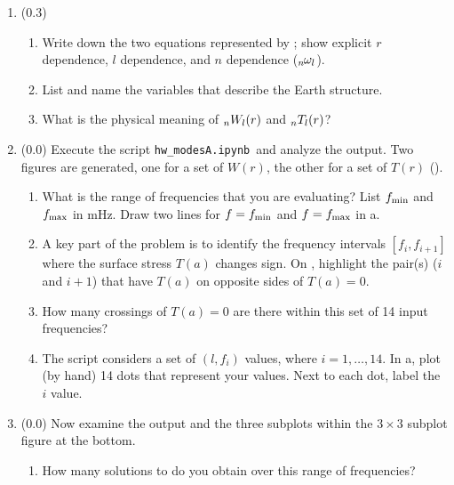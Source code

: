 \documentclass[11pt,titlepage,fleqn]{article}
\newcommand{\tfilemain}{{\tt hw\_modesA.ipynb}}
\begin{document}
\begin{enumerate}
\item (0.3)
%
\begin{enumerate}
\item Write down the two equations represented by ; show explicit $r$ dependence, $l$ dependence, and $n$ dependence (\eg $\mbox{${}_{n\hspace{-0.2 mm}}\omega_l$}$).
\item List and name the variables that describe the Earth structure.

\item What is the physical meaning of $\mbox{${}_nW_l$}(r)$ and $\mbox{${}_nT_l$}(r)$?
\end{enumerate}


\item (0.0) Execute the script \tfilemain\ and analyze the output. Two figures are generated, one for a set of $W(r)$, the other for a set of $T(r)$ ().
%
\begin{enumerate}
\item What is the range of frequencies that you are evaluating? List $f_{\rm min}$ and $f_{\rm max}$ in mHz. Draw two lines for $f = f_{\rm min}$ and $f = f_{\rm max}$ in a.

\item A key part of the problem is to identify the frequency intervals $[f_i, f_{i+1}]$ where the surface stress $T(a)$ changes sign. On , highlight the pair(s) ($i$ and $i+1$) that have $T(a)$ on opposite sides of $T(a) = 0$.

\item How many crossings of $T(a) = 0$ are there within this set of 14 input frequencies?

\item The script considers a set of $(l, f_i)$ values, where $i = 1, \ldots, 14$. In a, plot (by hand) 14 dots that represent your values. Next to each dot, label the $i$ value.

\end{enumerate}

\label{prob:Tr}


\item (0.0) Now examine the output and the three subplots within the $3 \times 3$ subplot figure at the bottom.
%
\begin{enumerate}
\item How many solutions to  do you obtain over this range of frequencies?


\end{enumerate}
\end{enumerate}
\end{document}
